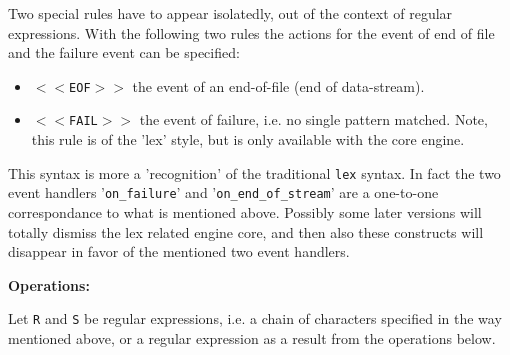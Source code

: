 Two special rules have to appear isolatedly, out of the context of regular
expressions. With the following two rules the actions for the event of 
end of file and the failure event can be specified:

\begin{itemize}

\item {\tt $<<$EOF$>>$} the event of an end-of-file (end of data-stream). 

\item {\tt $<<$FAIL$>>$} the event of failure, i.e. no single pattern matched. 
    Note, this rule is of the 'lex' style, but is only available with the 
    {\quex} core engine.

\end{itemize}

This syntax is more a 'recognition' of the traditional {\tt lex} syntax. In fact
    the two event handlers '{\tt on\_failure}' and '{\tt on\_end\_of\_stream}' are
    a one-to-one correspondance to what is mentioned above. Possibly some later
    versions will totally dismiss the lex related engine core, and then also
    these constructs will disappear in favor of the mentioned two event handlers.

{\bf Operations:}     

Let {\tt R} and {\tt S} be regular expressions, i.e. a chain of characters specified in the
way mentioned above, or a regular expression as a result from the operations below.
     
